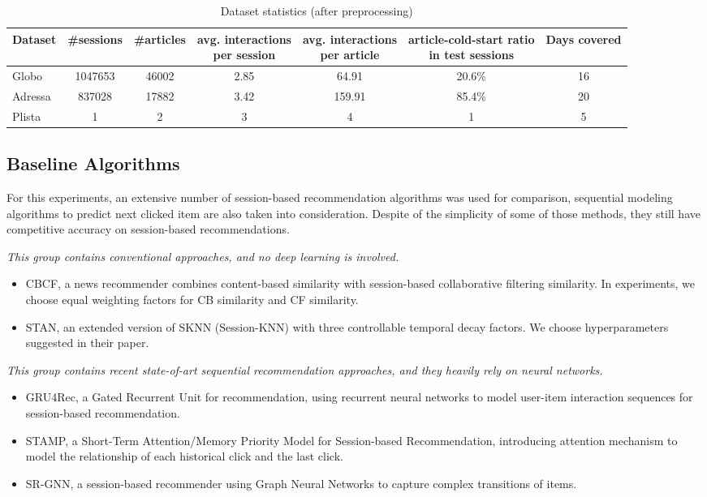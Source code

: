 \begin{table}[th]
  \caption{Dataset statistics (after preprocessing)}
  \label{tb:dataset}
  \centering
  \begin{tabular}{l|cccccc}
    \toprule
     Dataset & \#sessions & \#articles & \tabincell{c}{avg. interactions\\per session}  & \tabincell{c}{avg. interactions\\per article} & \tabincell{c}{article-cold-start ratio\\in test sessions} & Days covered\\
    \midrule
    Globo & 1047653 & 46002 & 2.85 & 64.91 & 20.6\% & 16 \\
    Adressa & 837028 & 17882 & 3.42 & 159.91 & 85.4\% & 20 \\
    Plista & 1 & 2 & 3 & 4 & 1 & 5 \\
    \bottomrule
  \end{tabular}
\end{table}
\subsection{Baseline Algorithms}
For this experiments, an extensive number of session-based recommendation algorithms was used for comparison, sequential modeling algorithms to predict next clicked item are also taken into consideration. Despite of the simplicity of some of those methods, they still have competitive accuracy on session-based recommendations.

\textit{This group contains conventional approaches, and no deep learning is involved.}
\begin{itemize}
  \item CBCF\cite{sottocornola2018session}, a news recommender combines content-based similarity with session-based collaborative filtering similarity. In experiments, we choose equal weighting factors for CB similarity and CF similarity.
  \item STAN\cite{garg2019sequence}, an extended version of SKNN (Session-KNN) with three controllable temporal decay factors. We choose hyperparameters suggested in their paper.
\end{itemize}

\textit{This group contains recent state-of-art sequential recommendation approaches, and they heavily rely on neural networks.}
\begin{itemize}
  \item GRU4Rec\cite{hidasi2015session, hidasi2018recurrent}, a Gated Recurrent Unit for recommendation, using recurrent neural networks to model user-item interaction sequences for session-based recommendation.
  \item STAMP\cite{liu2018stamp}, a Short-Term Attention/Memory Priority Model for Session-based Recommendation, introducing attention mechanism to model the relationship of each historical click and the last click.
  \item SR-GNN\cite{wu2019session}, a session-based recommender using Graph Neural Networks to capture complex transitions of items.
\end{itemize}
